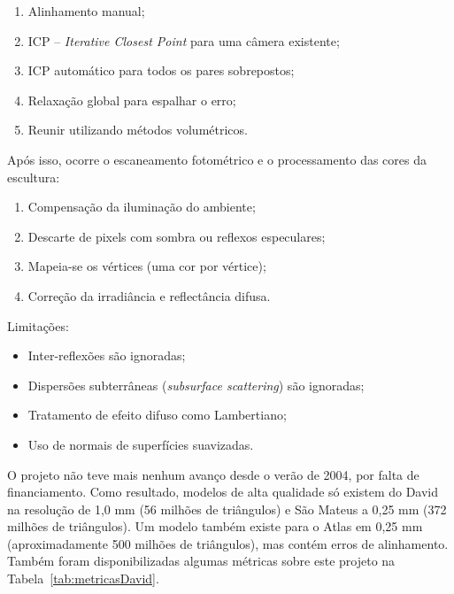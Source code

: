 \begin{enumerate}
\item{Alinhamento manual;}
\item{ICP -- \emph{Iterative Closest Point} para uma câmera existente;} %
\item{ICP automático para todos os pares sobrepostos;}
\item{Relaxação global para espalhar o erro;}
\item{Reunir utilizando métodos volumétricos.}
\end{enumerate}
Após isso, ocorre o escaneamento fotométrico e o processamento das cores da escultura:
\begin{enumerate}
\item{Compensação da iluminação do ambiente;}
\item{Descarte de pixels com sombra ou reflexos especulares;}
\item{Mapeia-se os vértices (uma cor por vértice);}
\item{Correção da irradiância e reflectância difusa.}
\end{enumerate}

Limitações:
\begin{itemize}
\item{Inter-reflexões são ignoradas;}
\item{Dispersões subterrâneas (\emph{subsurface scattering}) são ignoradas;}
\item{Tratamento de efeito difuso como Lambertiano;} %
\item{Uso de normais de superfícies suavizadas.}
\end{itemize}

O projeto não teve mais nenhum avanço desde o verão de 2004, por falta de
financiamento. Como resultado, modelos de alta qualidade só existem do David na
resolução de 1,0 mm (56 milhões de triângulos) e São Mateus a 0,25 mm (372
milhões de triângulos). Um modelo também existe para o Atlas em 0,25 mm
(aproximadamente 500 milhões de triângulos), mas contém erros de alinhamento.
Também foram disponibilizadas algumas métricas sobre este projeto na Tabela~\ref{tab:metricasDavid}.

